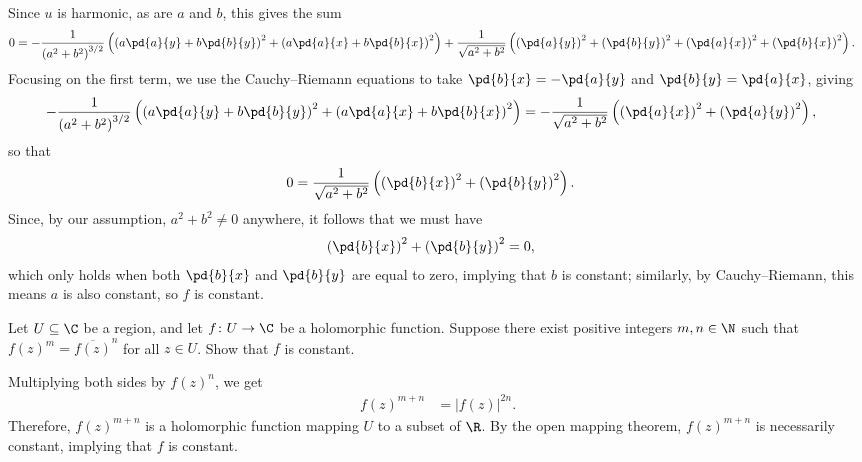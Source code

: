 \documentclass[10pt]{mypackage}
\begin{document}
\begin{solution}
\begin{align*}
  \end{align*}
  Since $u$ is harmonic, as are $a$ and $b$, this gives the sum
  \begin{align*}
    0 &= -\frac{1}{\left( a^2 + b^2 \right)^{3/2}} \left( \left( a \pd{a}{y} + b \pd{b}{y} \right)^2 + \left( a \pd{a}{x} + b \pd{b}{x} \right)^2 \right) + \frac{1}{\sqrt{a^2 + b^2}} \left( \left( \pd{a}{y} \right)^2 + \left( \pd{b}{y} \right)^2 + \left( \pd{a}{x} \right)^2 + \left( \pd{b}{x} \right)^2 \right).
  \end{align*}
  Focusing on the first term, we use the Cauchy--Riemann equations to take $ \pd{b}{x} = - \pd{a}{y} $ and $ \pd{b}{y} = \pd{a}{x} $, giving
  \begin{align*}
    -\frac{1}{\left( a^2 + b^2 \right)^{3/2}} \left( \left( a \pd{a}{y} + b \pd{b}{y} \right)^2 + \left( a \pd{a}{x} + b \pd{b}{x} \right)^2 \right) &= -\frac{1}{\sqrt{a^2 + b^2}}\left( \left( \pd{a}{x} \right)^2 + \left( \pd{a}{y} \right)^2 \right),
  \end{align*}
  so that
  \begin{align*}
    0 &= \frac{1}{\sqrt{a^2 + b^2}} \left( \left( \pd{b}{x} \right)^2 + \left( \pd{b}{y} \right)^2 \right).
  \end{align*}
  Since, by our assumption, $a^2 + b^2\neq 0$ anywhere, it follows that we must have
  \begin{align*}
    \left( \pd{b}{x} \right)^2 + \left( \pd{b}{y} \right)^2 &= 0,
  \end{align*}
  which only holds when both $ \pd{b}{x} $ and $ \pd{b}{y} $ are equal to zero, implying that $b$ is constant; similarly, by Cauchy--Riemann, this means $a$ is also constant, so $f$ is constant.
\end{solution}
\begin{problem}[Problem 5]
  Let $U\subseteq \C$ be a region, and let $f\colon U\rightarrow \C$ be a holomorphic function. Suppose there exist positive integers $m,n\in \N$ such that $f(z)^{m} = \overline{f\left( z \right)}^{n}$ for all $z\in U$. Show that $f$ is constant.
\end{problem}
\begin{solution}
  Multiplying both sides by $f(z)^{n}$, we get
  \begin{align*}
    f(z)^{m + n} &= \left\vert f(z) \right\vert^{2n}.
  \end{align*}
  Therefore, $f(z)^{m+n}$ is a holomorphic function mapping $U$ to a subset of $\R$. By the open mapping theorem, $f(z)^{m+n}$ is necessarily constant, implying that $f$ is constant.
\end{solution}
\end{document}
